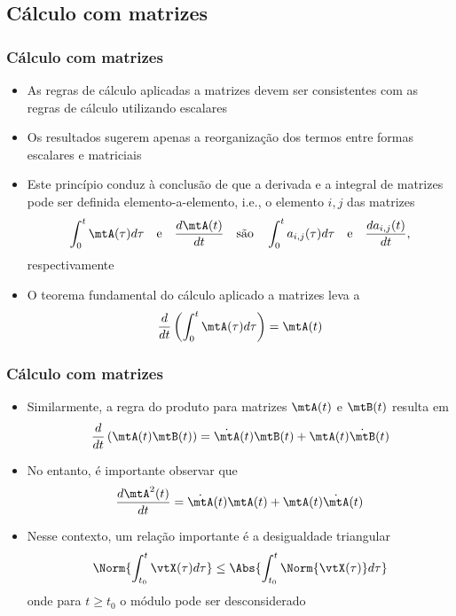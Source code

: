 \subsection{Cálculo com matrizes}

\begin{frame}
  \frametitle{Cálculo com matrizes}
  \begin{itemize}
    \item As regras de cálculo aplicadas a matrizes devem ser consistentes com as regras de cálculo utilizando escalares
    \item Os resultados sugerem apenas a reorganização dos termos entre formas escalares e matriciais
    \item Este princípio conduz à conclusão de que a derivada e a integral de matrizes pode ser definida elemento-a-elemento, i.e., o elemento $i,j$ das matrizes
    \begin{equation}
      \int_{0}^t \mtA(\tau)d\tau \quad \text{e} \quad \frac{d\mtA(t)}{dt} \quad \text{são} \quad \int_{0}^t a_{i,j}(\tau)d\tau \quad \text{e} \quad \frac{d a_{i,j}(t)}{dt},
    \end{equation}
    respectivamente
    \item O teorema fundamental do cálculo aplicado a matrizes leva a
    \begin{equation}
      \frac{d}{dt}\left(\int_{0}^t \mtA(\tau)d\tau\right) = \mtA(t)
    \end{equation}
  \end{itemize}
\end{frame}

\begin{frame}
  \frametitle{Cálculo com matrizes}
  \begin{itemize}
    \item Similarmente, a regra do produto para matrizes $\mtA(t)$ e $\mtB(t)$ resulta em
    \begin{equation}
      \frac{d}{dt}\left(\mtA(t)\mtB(t)\right) = \dot{\mtA}(t)\mtB(t) + \mtA(t)\dot{\mtB}(t)
    \end{equation}
    \item No entanto, é importante observar que
    \begin{equation}
      \frac{d\mtA^2(t)}{dt} = \dot{\mtA}(t)\mtA(t) + \mtA(t)\dot{\mtA}(t)
    \end{equation}
    \item Nesse contexto, um relação importante é a desigualdade triangular %
    \begin{equation}
      \Norm{\int_{t_0}^t \vtX(\tau)d\tau} \leq \Abs{\int_{t_0}^t \Norm{\vtX(\tau)}d\tau}
    \end{equation}
    onde para $ t \geq t_0 $ o módulo pode ser desconsiderado
  \end{itemize}
\end{frame}

